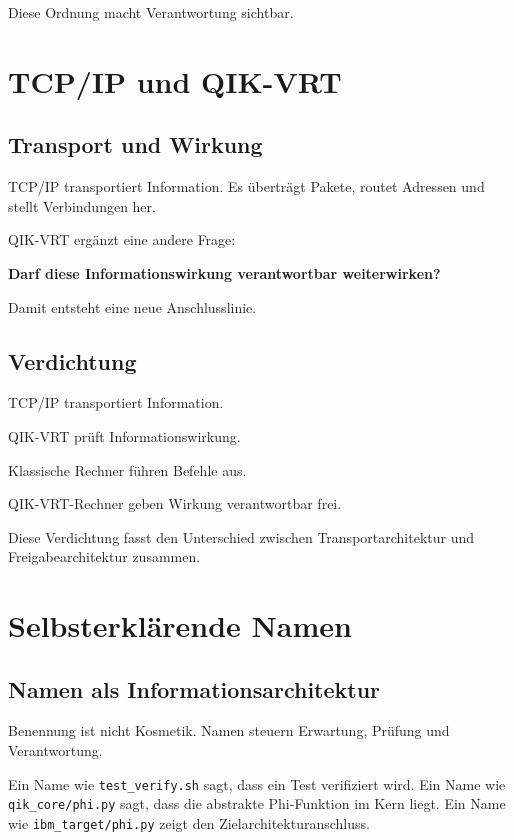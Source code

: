 \documentclass[11pt,a4paper,oneside]{book}
\begin{document}
Diese Ordnung macht Verantwortung sichtbar.

\chapter{TCP/IP und QIK-VRT}

\section{Transport und Wirkung}

TCP/IP transportiert Information. Es überträgt Pakete, routet Adressen und stellt Verbindungen her.

QIK-VRT ergänzt eine andere Frage:

\begin{merkbox}
\centering
\textbf{Darf diese Informationswirkung verantwortbar weiterwirken?}
\end{merkbox}

Damit entsteht eine neue Anschlusslinie.

\section{Verdichtung}

\begin{merkbox}
TCP/IP transportiert Information.\par
QIK-VRT prüft Informationswirkung.\par
Klassische Rechner führen Befehle aus.\par
QIK-VRT-Rechner geben Wirkung verantwortbar frei.
\end{merkbox}

Diese Verdichtung fasst den Unterschied zwischen Transportarchitektur und Freigabearchitektur zusammen.

\chapter{Selbsterklärende Namen}

\section{Namen als Informationsarchitektur}

Benennung ist nicht Kosmetik. Namen steuern Erwartung, Prüfung und Verantwortung.

Ein Name wie \texttt{test\_verify.sh} sagt, dass ein Test verifiziert wird. Ein Name wie \texttt{qik\_core/phi.py} sagt, dass die abstrakte Phi-Funktion im Kern liegt. Ein Name wie \texttt{ibm\_target/phi.py} zeigt den Zielarchitekturanschluss.
\end{document}
